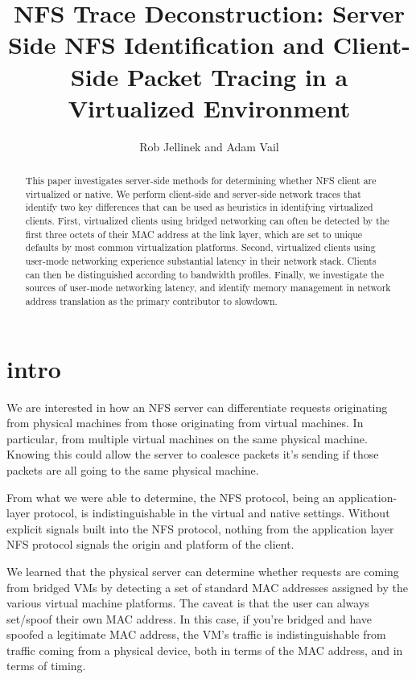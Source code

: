 \documentclass[11pt,pdftex,twocolumn]{article}
\title{NFS Trace Deconstruction: 
Server Side NFS Identification and Client-Side Packet Tracing in a Virtualized Environment}
\author{Rob Jellinek and Adam Vail}
\begin{document}
\maketitle

\begin{abstract}
This paper investigates server-side methods for determining whether NFS client are virtualized or native. We perform client-side and server-side network traces that identify two key differences that can be used as heuristics in identifying virtualized clients. First, virtualized clients using bridged networking can often be detected by the first three octets of their MAC address at the link layer, which are set to unique defaults by most common virtualization platforms. Second, virtualized clients using user-mode networking experience substantial latency in their network stack. Clients can then be distinguished according to bandwidth profiles. Finally, we investigate the sources of user-mode networking latency, and identify memory management in network address translation as the primary contributor to slowdown.
\end{abstract}

\section{intro}
We are interested in how an NFS server can differentiate requests originating from physical machines from those originating from virtual machines. In particular, from multiple virtual machines on the same physical machine. Knowing this could allow the server to coalesce packets it's sending if those packets are all going to the same physical machine. 

From what we were able to determine, the NFS protocol, being an application-layer protocol, is indistinguishable in the virtual and native settings. Without explicit signals built into the NFS protocol, nothing from the application layer NFS protocol signals the origin and platform of the client. 

We learned that the physical server can determine whether requests are coming from bridged VMs by detecting a set of standard MAC addresses assigned by the various virtual machine platforms. The caveat is that the user can always set/spoof their own MAC address. In this case, if you're bridged and have spoofed a legitimate MAC address, the VM's traffic is indistinguishable from traffic coming from a physical device, both in terms of the MAC address, and in terms of timing.
\end{document}
